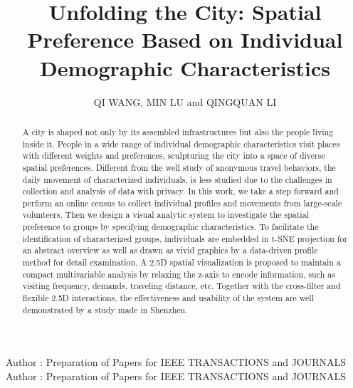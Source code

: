 \documentclass{ieeeaccess}
\begin{document}

\title{Unfolding the City: Spatial Preference Based on Individual Demographic Characteristics}


\author{\uppercase{Qi wang}, \uppercase{min lu} and \uppercase{Qingquan Li}}
\address[1]{State Key Laboratory of Information Engineering in Surveying, Mapping and Remote Sensing, Wuhan University, Wuhan 430072, China}
\address[2]{Shenzhen Key Laboratory of Spatial Smart Sensing and Services, Shenzhen University, Shenzhen 518060, China}
\address[3]{School of Architecture and Urban Planning, Shenzhen University, Shenzhen 518060, China}



\markboth
{Author \headeretal: Preparation of Papers for IEEE TRANSACTIONS and JOURNALS}
{Author \headeretal: Preparation of Papers for IEEE TRANSACTIONS and JOURNALS}


\begin{abstract}
A city is shaped not only by its assembled infrastructures but also the people living inside it. People in a wide range of individual demographic characteristics visit places with different weights and preferences, sculpturing the city into a space of diverse spatial preferences. Different from the well study of anonymous travel behaviors, the daily movement of characterized individuals, is less studied due to the challenges in collection and analysis of data with privacy. In this work, we take a step forward and perform an online census to collect individual profiles and movements from large-scale volunteers. Then we design a visual analytic system to investigate the spatial preference to groups by specifying demographic characteristics. To facilitate the identification of characterized groups, individuals are embedded in t-SNE projection for an abstract overview as well as drawn as vivid graphics by a data-driven profile method for detail examination. A 2.5D spatial visualization is proposed to maintain a compact multivariable analysis by relaxing the z-axis to encode information, such as visiting frequency, demands, traveling distance, etc. Together with the cross-filter and flexible 2.5D interactions, the effectiveness and usability of the system are well demonstrated by a study made in Shenzhen.\end{abstract}
\end{document}
